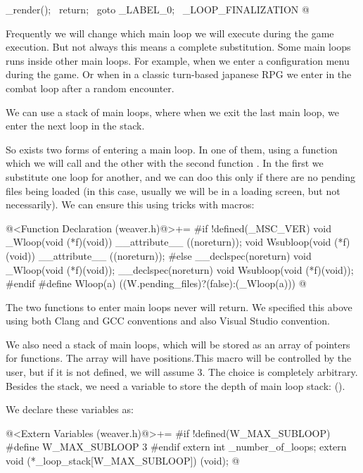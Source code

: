   _render();                                               \
  return;                                                  \
  goto _LABEL_0;                                           \
_LOOP_FINALIZATION
@
\fimcodigo


Frequently we will change which main loop we will execute during the
game execution. But not always this means a complete
substitution. Some main loops runs inside other main loops. For
example, when we enter a configuration menu during the game. Or when
in a classic turn-based japanese RPG we enter in the combat loop after
a random encounter.

We can use a stack of main loops, where when we exit the last main
loop, we enter the next loop in the stack.

So exists two forms of entering a main loop. In one of them, using a
function which we will call  and the other with the
second function . In the first we substitute one
loop for another, and we can doo this only if there are no pending
files being loaded (in this case, usually we will be in a loading
screen, but not necessarily). We can ensure this using tricks with
macros:

\iniciocodigo
@<Function Declaration (weaver.h)@>+=
#if !defined(_MSC_VER)
void _Wloop(void (*f)(void)) __attribute__ ((noreturn));
void Wsubloop(void (*f)(void)) __attribute__ ((noreturn));
#else
__declspec(noreturn) void _Wloop(void (*f)(void));
__declspec(noreturn) void Wsubloop(void (*f)(void));
#endif
#define Wloop(a) ((W.pending_files)?(false):(_Wloop(a)))
@
\fimcodigo

The two functions to enter main loops never will return. We specified
this above using both Clang and GCC conventions and also Visual Studio
convention.

We also need a stack of main loops, which will be stored as an array
of pointers for functions. The array will
have  positions.This macro will be
controlled by the user, but if it is not defined, we will assume
3. The choice is completely arbitrary. Besides the stack, we need a
variable to store the depth of main loop stack:
(\monoespaco{\_number\_of\_loops}).

We declare these variables as:

\iniciocodigo
@<Extern Variables (weaver.h)@>+=
#if !defined(W_MAX_SUBLOOP)
#define W_MAX_SUBLOOP 3
#endif
extern int _number_of_loops;
extern void (*_loop_stack[W_MAX_SUBLOOP]) (void);
@
\fimcodigo

